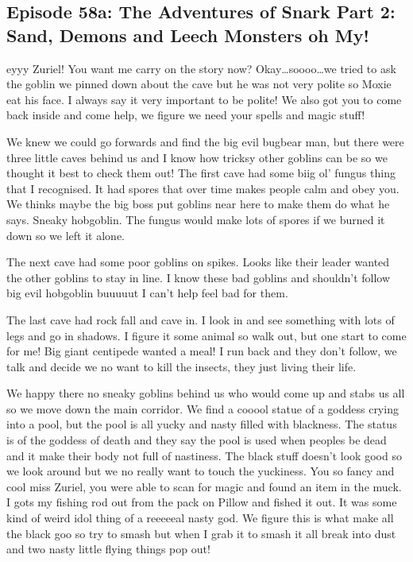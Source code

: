 \subsection{Episode 58a: The Adventures of Snark Part 2: Sand, Demons and Leech Monsters oh My!}

eyyy Zuriel! You want me carry on the story now? Okay…soooo…we tried to ask the goblin we pinned down about the cave but he was not very polite so Moxie eat his face. I always say it very important to be polite! We also got you to come back inside and come help, we figure we need your spells and magic stuff!\medskip

We knew we could go forwards and find the big evil bugbear man, but there were three little caves behind us and I know how tricksy other goblins can be so we thought it best to check them out! The first cave had some biig ol’ fungus thing that I recognised. It had spores that over time makes people calm and obey you. We thinks maybe the big boss put goblins near here to make them do what he says. Sneaky hobgoblin. The fungus would make lots of spores if we burned it down so we left it alone.\medskip

The next cave had some poor goblins on spikes. Looks like their leader wanted the other goblins to stay in line. I know these bad goblins and shouldn’t follow big evil hobgoblin buuuuut I can’t help feel bad for them.\medskip

The last cave had rock fall and cave in. I look in and see something with lots of legs and go in shadows. I figure it some animal so walk out, but one start to come for me! Big giant centipede wanted a meal! I run back and they don’t follow, we talk and decide we no want to kill the insects, they just living their life.\medskip

We happy there no sneaky goblins behind us who would come up and stabs us all so we move down the main corridor. We find a cooool statue of a goddess crying into a pool, but the pool is all yucky and nasty filled with blackness. The status is of the goddess of death and they say the pool is used when peoples be dead and it make their body not full of nastiness. The black stuff doesn’t look good so we look around but we no really want to touch the yuckiness. You so fancy and cool miss Zuriel, you were able to scan for magic and found an item in the muck. I gots my fishing rod out from the pack on Pillow and fished it out. It was some kind of weird idol thing of a reeeeeal nasty god. We figure this is what make all the black goo so try to smash but when I grab it to smash it all break into dust and two nasty little flying things pop out!\medskip

